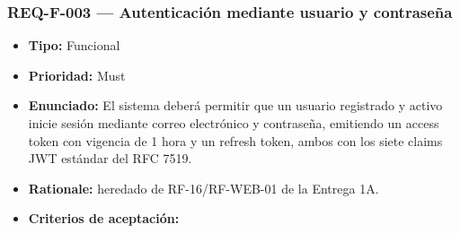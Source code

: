\documentclass[
  spanish,
]{article}
\providecommand{\tightlist}{%
  \setlength{\itemsep}{0pt}\setlength{\parskip}{0pt}}
\begin{document}
\subsubsection{REQ-F-003 --- Autenticación mediante usuario y
contraseña}\label{req-f-003-autenticaciuxf3n-mediante-usuario-y-contraseuxf1a}

\begin{itemize}
\tightlist
\item
  \textbf{Tipo:} Funcional
\item
  \textbf{Prioridad:} Must
\item
  \textbf{Enunciado:} El sistema deberá permitir que un usuario
  registrado y activo inicie sesión mediante correo electrónico y
  contraseña, emitiendo un access token con vigencia de 1 hora y un
  refresh token, ambos con los siete claims JWT estándar del RFC 7519.
\item
  \textbf{Rationale:} heredado de RF-16/RF-WEB-01 de la Entrega 1A.
\item
  \textbf{Criterios de aceptación:}


\end{itemize}
\end{document}
